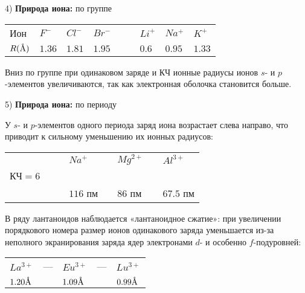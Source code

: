 \par\smallskip	

4) \textbf{Природа иона:} по группе

\par\smallskip

\begin{center}
\begin{tabular}[c]{lllll|llll}
	Ион & $F^-$ & $Cl^-$ & $Br^-$ &  &  & $Li^+$ & $Na^+$ & $K^+$ \\
	$R(\textup{\AA})$   & $1.36$ & $1.81$ & $1.95$ &  &  & $0.6$ & $0.95$ & $1.33$
\end{tabular}
\end{center}

\par\smallskip
	
Вниз по группе при одинаковом заряде и КЧ ионные радиусы
ионов $s$- и $p$-элементов увеличиваются, так как электронная
оболочка становится больше.

\par\smallskip

5) \textbf{Природа иона:} по периоду

\par\smallskip

У $s$- и $p$-элементов одного периода заряд иона возрастает слева
направо, что приводит к сильному уменьшению их ионных
радиусов:

\par\smallskip

\begin{center}
\begin{tabular}[c]{llllllll}
	&  &  & $Na^+$ &  & $Mg^{2+}$ &  & $Al^{3+}$ \\
	КЧ$=6$ &  &  &   &  &   &  &   \\
	&  &  & $116$ пм &  & $86$ пм &  & $67.5$ пм
\end{tabular}
\end{center}

\par\smallskip

В ряду лантаноидов наблюдается «лантаноидное сжатие»: при
увеличении порядкового номера размер ионов одинакового заряда
уменьшается из-за неполного экранирования заряда ядер
электронами $d$- и особенно $f$-подуровней:

\par\smallskip

\begin{center}
	\begin{tabular}[c]{lllll}
		$La^{3+}$ & --- & $Eu^{3+}$ & --- & $Lu^{3+}$ \\
		$1.20\textup{\AA}$ &     & $1.09\textup{\AA}$ &     & $0.99\textup{\AA}$
	\end{tabular}
\end{center}

